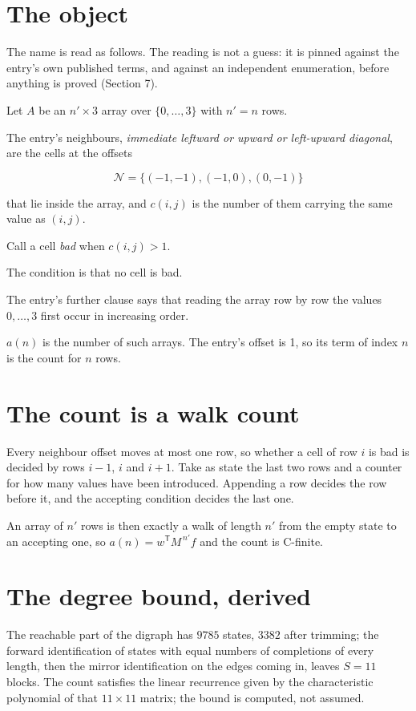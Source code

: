 \documentclass[11pt]{article}
\theoremstyle{definition}
\begin{document}
\section{The object}

The name is read as follows. The reading is not a guess: it is pinned against the entry's own published terms, and against an independent enumeration, before anything is proved (Section 7).

Let $A$ be an $n' \times 3$ array over $\{0,\dots,3\}$ with $n' = n$ rows.

The entry's neighbours, {\itshape immediate leftward or upward or left-upward diagonal}, are the cells at the offsets

\[\mathcal{N} = \{(-1,-1), (-1,0), (0,-1)\}\]

that lie inside the array, and $c(i,j)$ is the number of them carrying the same value as $(i,j)$.

Call a cell {\itshape bad} when $c(i,j) > 1$.

The condition is that no cell is bad.

The entry's further clause says that reading the array row by row the values $0,\dots,3$ first occur in increasing order.

$a(n)$ is the number of such arrays. The entry's offset is 1, so its term of index $n$ is the count for $n$ rows.

\section{The count is a walk count}

Every neighbour offset moves at most one row, so whether a cell of row $i$ is bad is decided by rows $i-1$, $i$ and $i+1$. Take as state the last two rows and a counter for how many values have been introduced. Appending a row decides the row before it, and the accepting condition decides the last one.

An array of $n'$ rows is then exactly a walk of length $n'$ from the empty state to an accepting one, so $a(n) = w^{\mathsf T}M^{\,n'}f$ and the count is C-finite.

\section{The degree bound, derived}

The reachable part of the digraph has $9785$ states, $3382$ after trimming; the forward identification of states with equal numbers of completions of every length, then the mirror identification on the edges coming in, leaves $S = 11$ blocks. The count satisfies the linear recurrence given by the characteristic polynomial of that $11\times11$ matrix; the bound is computed, not assumed.
\end{document}
